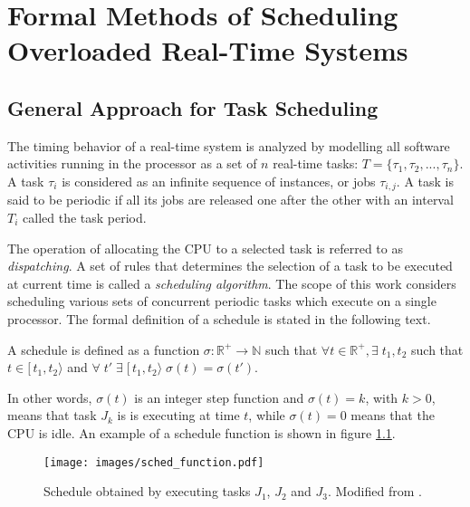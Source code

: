 \chapter{Formal Methods of Scheduling Overloaded Real-Time Systems}
\label{fm}
\section{General Approach for Task Scheduling}
The timing behavior of a real-time system is analyzed by modelling all software activities running in the processor as a set of $n$ real-time tasks: $T = \{\tau_1, \tau_2, ..., \tau_n\}$.
A task $\tau_i$ is considered as an infinite sequence of instances, or jobs $\tau_{i,j}$.
A task is said to be periodic if all its jobs are released one after the other with an interval $T_i$ called the task period.

The operation of allocating the CPU to a selected task is referred to as \textit{dispatching}.
A set of rules that determines the selection of a task to be executed at current time is called a 
\textit{scheduling algorithm}.
The scope of this work considers scheduling various sets of concurrent periodic tasks which execute on a single processor.
The formal definition of a schedule is stated in the following text.
\begin{mydef}
A schedule is defined as a function $\sigma : \mathbb{R}^{+} \rightarrow \mathbb{N}$ such that 
$\forall t \in \mathbb{R}^{+}, \exists \; t_1, t_2$ such that $t \in [\, t_1, t_2 \rangle$ and 
$\forall \; t' \; \exists \; [\, t_1, t_2 \rangle \; \sigma(t) = \sigma(t')$.
\end{mydef}
In other words, $\sigma(t)$ is an integer step function and $\sigma(t) = k$, with $k > 0$, means that task $J_k$ is is executing at time $t$, while $\sigma(t) = 0$ means that the CPU is idle.
An example of a schedule function is shown in figure \ref{schedule_function}.
\begin{figure}[ht]
    \centering
    \texttt{[image: images/sched\_function.pdf]}
    \caption{Schedule obtained by executing tasks $J_1$, $J_2$ and $J_3$. Modified from \cite{buttazzo2011hard}.}
    \label{schedule_function}
\end{figure}

